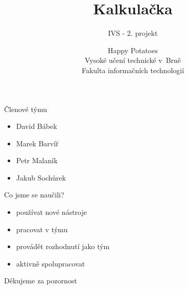\documentclass{beamer}
\begin{document}
\begin{frame}
\title{Kalkulačka}
\subtitle{IVS - 2. projekt}
\author{Happy Potatoes \medskip\\Vysoké učení technické v~Brně\\Fakulta informačních technologií}

\maketitle
\end{frame}

\begin{frame}{Členové týmu}
\begin{itemize}
\item David Bábek
\item Marek Barvíř
\item Petr Malaník
\item Jakub Sochůrek
\end{itemize}
\end{frame}

\begin{frame}{ Co jsme se naučili?}
\begin{itemize}
\item používat nové nástroje
\item pracovat v týmu
\item provádět rozhodnutí jako tým
\item aktivně spolupracovat
\end{itemize}

\end{frame}
\begin{frame}
\begin{center}
\Large{Děkujeme za pozornost}
\end{center}
\end{frame}
\end{document}
